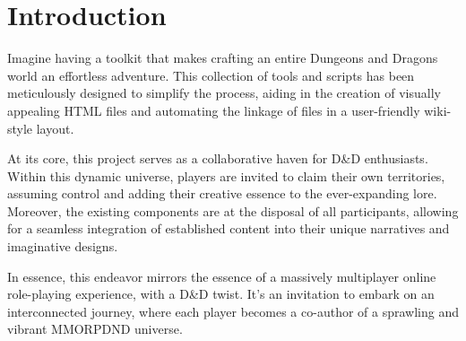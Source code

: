 \chapter{Introduction}

Imagine having a toolkit that makes crafting an entire Dungeons and Dragons world an effortless adventure. This collection of tools and scripts has been meticulously designed to simplify the process, aiding in the creation of visually appealing HTML files and automating the linkage of files in a user-friendly wiki-style layout.

At its core, this project serves as a collaborative haven for D\&D enthusiasts. Within this dynamic universe, players are invited to claim their own territories, assuming control and adding their creative essence to the ever-expanding lore. Moreover, the existing components are at the disposal of all participants, allowing for a seamless integration of established content into their unique narratives and imaginative designs.

In essence, this endeavor mirrors the essence of a massively multiplayer online role-playing experience, with a D\&D twist. It's an invitation to embark on an interconnected journey, where each player becomes a co-author of a sprawling and vibrant MMORPDND universe.